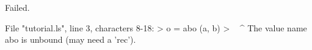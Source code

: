 \runverbatimfalse
{}
\begin{RunVerbatimMsg}
Failed.
\end{RunVerbatimMsg}
\begin{RunVerbatimErr}
File "tutorial.ls", line 3, characters 8-18:
>    o = abo (a, b)
>        ^^^^^^^^^^
The value name abo is unbound (may need a 'rec').
\end{RunVerbatimErr}
